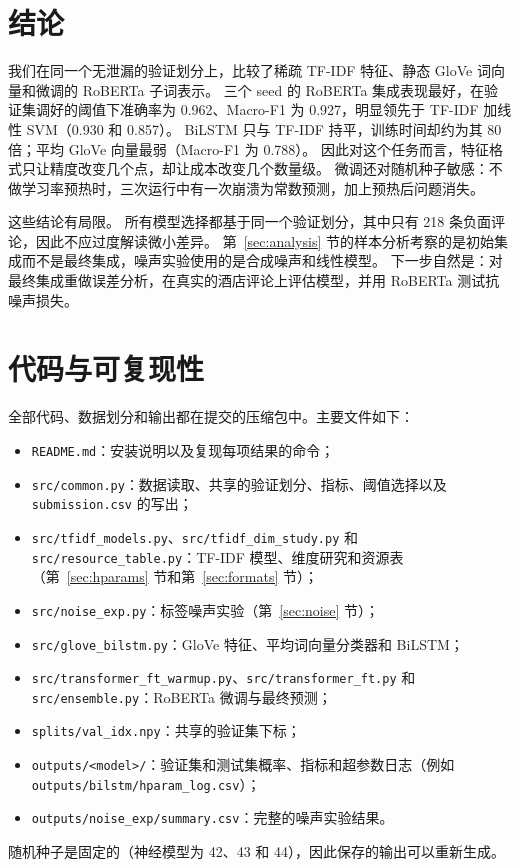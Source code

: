 \documentclass[11pt,a4paper]{article}
\begin{document}
\section{结论}\label{sec:conclusion}
我们在同一个无泄漏的验证划分上，比较了稀疏 TF-IDF 特征、静态 GloVe 词向量和微调的 RoBERTa 子词表示。
三个 seed 的 RoBERTa 集成表现最好，在验证集调好的阈值下准确率为 0.962、Macro-F1 为 0.927，明显领先于 TF-IDF 加线性 SVM（0.930 和 0.857）。
BiLSTM 只与 TF-IDF 持平，训练时间却约为其 80 倍；平均 GloVe 向量最弱（Macro-F1 为 0.788）。
因此对这个任务而言，特征格式只让精度改变几个点，却让成本改变几个数量级。
微调还对随机种子敏感：不做学习率预热时，三次运行中有一次崩溃为常数预测，加上预热后问题消失。

这些结论有局限。
所有模型选择都基于同一个验证划分，其中只有 218 条负面评论，因此不应过度解读微小差异。
第~\ref{sec:analysis} 节的样本分析考察的是初始集成而不是最终集成，噪声实验使用的是合成噪声和线性模型。
下一步自然是：对最终集成重做误差分析，在真实的酒店评论上评估模型，并用 RoBERTa 测试抗噪声损失。

\appendix
\section{代码与可复现性}\label{app:code}
全部代码、数据划分和输出都在提交的压缩包中。主要文件如下：
\begin{itemize}
  \item \texttt{README.md}：安装说明以及复现每项结果的命令；
  \item \texttt{src/common.py}：数据读取、共享的验证划分、指标、阈值选择以及 \texttt{submission.csv} 的写出；
  \item \texttt{src/tfidf\_models.py}、\texttt{src/tfidf\_dim\_study.py} 和 \texttt{src/resource\_table.py}：TF-IDF 模型、维度研究和资源表（第~\ref{sec:hparams} 节和第~\ref{sec:formats} 节）；
  \item \texttt{src/noise\_exp.py}：标签噪声实验（第~\ref{sec:noise} 节）；
  \item \texttt{src/glove\_bilstm.py}：GloVe 特征、平均词向量分类器和 BiLSTM；
  \item \texttt{src/transformer\_ft\_warmup.py}、\texttt{src/transformer\_ft.py} 和 \texttt{src/ensemble.py}：RoBERTa 微调与最终预测；
  \item \texttt{splits/val\_idx.npy}：共享的验证集下标；
  \item \texttt{outputs/<model>/}：验证集和测试集概率、指标和超参数日志（例如 \texttt{outputs/bilstm/hparam\_log.csv}）；
  \item \texttt{outputs/noise\_exp/summary.csv}：完整的噪声实验结果。
\end{itemize}
随机种子是固定的（神经模型为 42、43 和 44），因此保存的输出可以重新生成。



\end{document}
